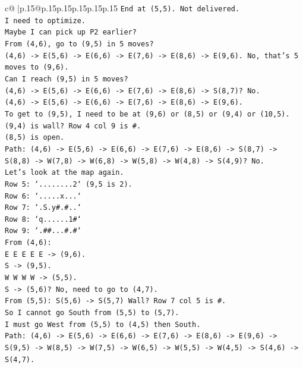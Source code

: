 \documentclass{article}
\begin{document}
{\begin{supertabular}{c@{$\;$}|p{.15\linewidth}@{}p{.15\linewidth}p{.15\linewidth}p{.15\linewidth}p{.15\linewidth}p{.15\linewidth}}
{{{\texttt{End at (5,5). Not delivered.} \\
\texttt{I need to optimize.} \\
\texttt{Maybe I can pick up P2 earlier?} \\
\texttt{From (4,6), go to (9,5) in 5 moves?} \\
\texttt{(4,6) {-}> E(5,6) {-}> E(6,6) {-}> E(7,6) {-}> E(8,6) {-}> E(9,6). No, that's 5 moves to (9,6).} \\
\texttt{Can I reach (9,5) in 5 moves?} \\
\texttt{(4,6) {-}> E(5,6) {-}> E(6,6) {-}> E(7,6) {-}> E(8,6) {-}> S(8,7)? No.} \\
\texttt{(4,6) {-}> E(5,6) {-}> E(6,6) {-}> E(7,6) {-}> E(8,6) {-}> E(9,6).} \\
\texttt{To get to (9,5), I need to be at (9,6) or (8,5) or (9,4) or (10,5).} \\
\texttt{(9,4) is wall? Row 4 col 9 is \#.} \\
\texttt{(8,5) is open.} \\
\texttt{Path: (4,6) {-}> E(5,6) {-}> E(6,6) {-}> E(7,6) {-}> E(8,6) {-}> S(8,7) {-}> S(8,8) {-}> W(7,8) {-}> W(6,8) {-}> W(5,8) {-}> W(4,8) {-}> S(4,9)? No.} \\
\texttt{Let's look at the map again.} \\
\texttt{Row 5: `........2` (9,5 is 2).} \\
\texttt{Row 6: `.....x...`} \\
\texttt{Row 7: `.S.y\#.\#..`} \\
\texttt{Row 8: `q......1\#`} \\
\texttt{Row 9: `.\#\#...\#.\#`} \\
\texttt{From (4,6):} \\
\texttt{E E E E E {-}> (9,6).} \\
\texttt{S {-}> (9,5).} \\
\texttt{W W W W {-}> (5,5).} \\
\texttt{S {-}> (5,6)? No, need to go to (4,7).} \\
\texttt{From (5,5): S(5,6) {-}> S(5,7) Wall? Row 7 col 5 is \#.} \\
\texttt{So I cannot go South from (5,5) to (5,7).} \\
\texttt{I must go West from (5,5) to (4,5) then South.} \\
\texttt{Path: (4,6) {-}> E(5,6) {-}> E(6,6) {-}> E(7,6) {-}> E(8,6) {-}> E(9,6) {-}> S(9,5) {-}> W(8,5) {-}> W(7,5) {-}> W(6,5) {-}> W(5,5) {-}> W(4,5) {-}> S(4,6) {-}> S(4,7).} \\
}}}
\end{supertabular}}
\end{document}
